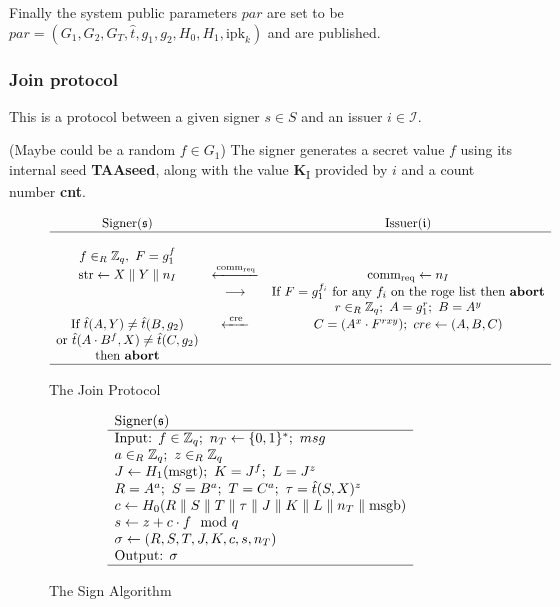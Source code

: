 Finally the system public parameters $par$ are set to be $par = (G_1, G_2, G_T, \hat{t}, g_1, g_2, H_0, H_1, \text{ipk}_k)$ and are published.

\subsubsection*{Join protocol}

This is a protocol between a given signer $s \in S$  and an issuer $i \in \mathcal{I}$.


(Maybe could be a random $f \in G_1$)
The signer generates a secret value $f$ using its internal seed \textbf{TAAseed}, along with the value \textbf{K}\textsubscript{I} provided by $i$ and a count number \textbf{cnt}.

\begin{figure}[H]
$$
\begin{array}{ccc}
    \text{Signer}(\mathfrak{s}) &    & \text{Issuer}(\mathfrak{i}) \\
    \hline
    \\
    f \in_R {\mathbb Z}_q, \ F = g_1^f &    &    \\
    \text{str} \leftarrow X \parallel Y \parallel n_I &  \xleftarrow{\text{comm}_{\text{req}}} & \text{comm}_{\text{req}} \leftarrow n_I \\
        & \longrightarrow & \text{If } F = g_1^{f_i} \text{ for any } f_i \text{ on the roge list then \textbf{abort}} \\
        &        & r\in_R {\mathbb Z}_q; \ A = g_1^r; \ B = A^y \\
    \text{If } \hat{t}(A,Y) \neq \hat{t}(B,g_2) & \xleftarrow{\text{  cre  }} & C = (A^x \cdot F^{rxy}); \ cre \leftarrow(A,B,C) \\
    \text{or } \hat{t}(A \cdot B^f , X) \neq \hat{t}(C,g_2) &    & \\
    \text{then \textbf{abort}} &    & \\
    \hline
\end{array} 
$$
\caption{The Join Protocol}
\label{fig:join}
\end{figure}

\begin{figure}[H]
$$\begin{array}{l}
\text{Signer}(\mathfrak{s}) \\
\hline
\text{Input: } f \in {\mathbb Z}_q; \ n_T \leftarrow \{0,1\}^\ast; \ msg \\
a \in_R {\mathbb Z}_q; \ z \in_R {\mathbb Z}_q \\
J \leftarrow H_1(\text{msgt}); \ K = J^f; \ L = J^z \\
R = A^a; \ S = B^a; \ T = C^a; \ \tau = \hat{t}(S,X)^z \\
c \leftarrow H_0(R \parallel S \parallel T \parallel \tau \parallel J \parallel K \parallel L \parallel n_T \parallel \text{msgb}) \\
s \leftarrow z + c \cdot f \mod q \\
\sigma \leftarrow (R,S,T,J,K,c,s,n_T) \\
\text{Output: } \sigma \\
\hline
\end{array}
$$
\caption{The Sign Algorithm}
\label{fig:sign}
\end{figure}

